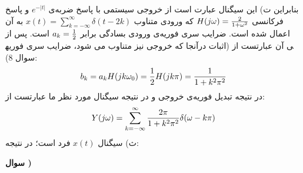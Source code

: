 \documentclass[10pt,letterpaper]{article}
\newcounter{QuestionNumber}
\newcommand{\Q}{
\textbf{
سوال \theQuestionNumber)
}
\stepcounter{QuestionNumber}
}
\begin{document}
بنابراین
ت) این سیگنال عبارت است از خروجی سیستمی با پاسخ ضربه‌ی 
$
e^{-|t|}
$
 و پاسخ فرکانسی
$
H(j\omega)={2\over 1+\omega^2}
$
 که ورودی متناوب
$
x(t)=\sum_{k=-\infty}^{\infty}\delta(t-2k)
$
 به آن اعمال شده است. ضرایب سری فوریه‌ی ورودی بسادگی برابر 
$
a_k={1\over 2}
$
است. پس از آنجا که خروجی نیز متناوب می شود، ضرایب سری فوریه‎ی آن عبارتست از (اثبات در سوال 8):
$$
b_k=a_kH(jk\omega_0)={1\over 2}H(jk\pi)={1\over 1+k^2\pi^2}
$$
در نتیجه تبدیل فوریه‌ی خروجی و در نتیجه سیگنال مورد نظر ما عبارتست از:
$$
Y(j\omega)=\sum_{k=-\infty}^{\infty}{2\pi\over 1+k^2\pi^2}\delta(\omega-k\pi)
$$
ث) سیگنال $x(t)$ فرد است؛ در نتیجه:
\Q
\end{document}
